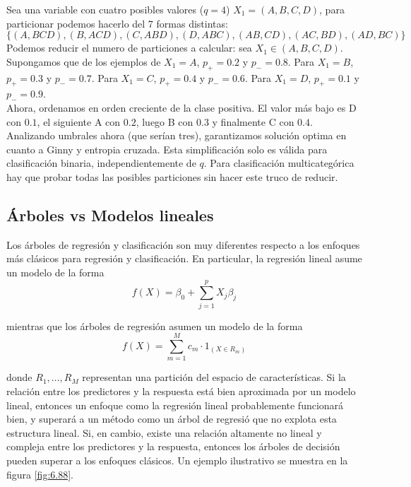 \begin{example}
Sea una variable con cuatro posibles valores ($q = 4$) $X_1 = (A, B, C, D)$, para particionar podemos hacerlo del 7 formas distintas: 
\begin{equation}
\{(A, BCD), (B, ACD), (C, ABD), (D, ABC), (AB, CD), (AC, BD), (AD, BC)\}
\end{equation}
Podemos reducir el numero de particiones a calcular: sea $X_1 \in (A, B, C, D)$. Supongamos que de los ejemplos de $X_1 = A$, $p_+ = 0.2$ y $p_- = 0.8$. Para $X_1 = B$, $p_+ = 0.3$ y $p_- = 0.7$. Para $X_1 = C$, $p_+ = 0.4$ y $p_- = 0.6$. Para $X_1 = D$, $p_+ = 0.1$ y $p_- = 0.9$. \\

Ahora, ordenamos en orden creciente de la clase positiva. El valor más bajo es D con $0.1$, el siguiente A con $0.2$, luego B con $0.3$ y finalmente C con $0.4$. Analizando umbrales ahora (que serían tres), garantizamos solución optima en cuanto a Ginny y entropia cruzada. Esta simplificación solo es válida para clasificación binaria, independientemente de $q$. Para clasificación multicategórica hay que probar todas las posibles particiones sin hacer este truco de reducir.
\end{example}

\subsection{Árboles vs Modelos lineales}

Los árboles de regresión y clasificación son muy diferentes respecto a los enfoques más clásicos para regresión y clasificación. En particular, la regresión lineal asume un modelo de la forma
\begin{equation}
f(X) = \beta_0 + \sum_{j=1}^{p} X_j \beta_j
\end{equation}

\noindent mientras que los árboles de regresión asumen un modelo de la forma
\begin{equation}
f(X) = \sum_{m=1}^{M} c_m \cdot 1_{(X \in R_m)}
\end{equation}

donde $R_1, \ldots, R_M$ representan una partición del espacio de características. Si la relación entre los predictores y la respuesta está bien aproximada por un modelo lineal, entonces un enfoque como la regresión lineal probablemente funcionará bien, y superará a un método como un árbol de regresió que no explota esta estructura lineal. Si, en cambio, existe una relación altamente no lineal y compleja entre los predictores y la respuesta, entonces los árboles de decisión pueden superar a los enfoques clásicos. Un ejemplo ilustrativo se muestra en la figura \ref{fig:6.88}. 

